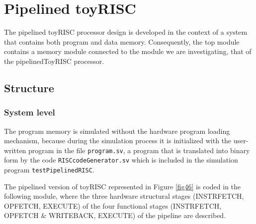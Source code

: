 \newpage

\section{Pipelined toyRISC}

The pipelined toyRISC processor design is developed in the context of a system that contains both program and data memory. Consequently, the top module contains a memory module connected to the module we are investigating, that of the pipelinedToyRISC processor.

\subsection{Structure}

\subsubsection{System level}


The program memory is simulated without the hardware program loading mechanism, because during the simulation process it is initialized with the user-written program in the file {\tt program.sv}, a program that is translated into binary form by the code {\tt RISCcodeGenerator.sv} which is included in the simulation program {\tt testPipelinedRISC}.


The pipelined version of toyRISC represented in Figure \ref{fig46} is coded in the following module, where the three hardware structural stages (INSTRFETCH, OPFETCH, EXECUTE) of the four functional stages (INSTRFETCH, OPFETCH \& WRITEBACK, EXECUTE) of the pipeline are described. 


